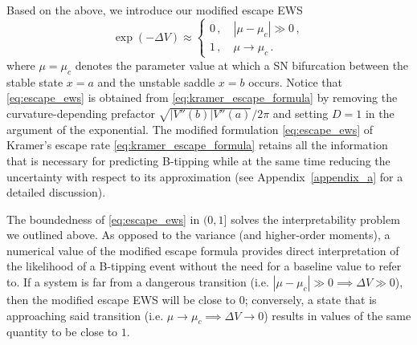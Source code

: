 \documentclass[a4paper,fleqn]{cas-sc}
\newcommand{\aref}[1]{Appendix~\ref{#1}}
\begin{document}
Based on the above, we introduce our modified escape EWS
%
\begin{equation}\label{eq:escape_ews}
        \exp(-\Delta V) \approx 
   \begin{cases}
       0\,, \quad |\mu - \mu_{c}| \gg 0\,,\\
       1\,, \quad \mu \to \mu_{c}\,. 
   \end{cases}
\end{equation}
%
where $\mu=\mu_c$ denotes the parameter value at which a SN bifurcation between the stable state $x=a$ and the unstable saddle $x=b$ occurs.
Notice that \eqref{eq:escape_ews} is obtained from \eqref{eq:kramer_escape_formula} by removing the curvature-depending prefactor $\sqrt{|V''(b)|V''(a)}/2\pi$ and setting $D=1$ in the argument of the exponential.
The modified formulation \eqref{eq:escape_ews} of Kramer's escape rate \eqref{eq:kramer_escape_formula} retains all the information that is necessary for predicting B-tipping while at the same time reducing the uncertainty with respect to its approximation (see \aref{appendix_a} for a detailed discussion).

The boundedness of \eqref{eq:escape_ews} in $(0,1]$ solves the interpretability problem we outlined above.
As opposed to the variance (and higher-order moments), a numerical value of the modified escape formula provides direct interpretation of the likelihood of a B-tipping event without the need for a baseline value to refer to.
If a system is far from a dangerous transition (i.e. $|\mu-\mu_c|\gg0\implies\Delta V\gg0$), then the modified escape EWS will be close to $0$; conversely, a state that is approaching said transition (i.e. $\mu\to\mu_c\implies\Delta V\to0$) results in values of the same quantity to be close to $1$.
\end{document}
